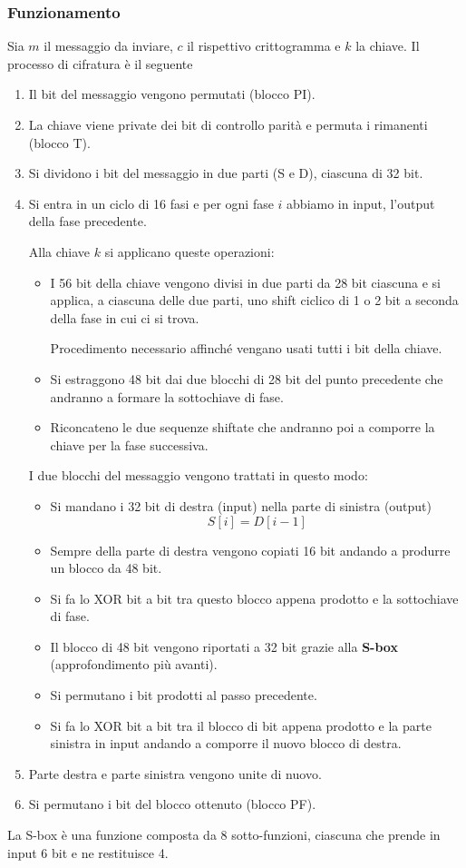 \subsubsection{Funzionamento}
Sia $m$ il messaggio da inviare, $c$ il rispettivo crittogramma e $k$ la chiave. Il processo di cifratura \`e il seguente
\begin{enumerate}
	\item Il bit del messaggio vengono permutati (blocco PI).
	\item La chiave viene private dei bit di controllo parit\`a e permuta i rimanenti (blocco T).
	\item Si dividono i bit del messaggio in due parti (S e D), ciascuna di 32 bit.
	\item Si entra in un ciclo di 16 fasi e per ogni fase $i$ abbiamo in input, l'output della fase precedente.

	      Alla chiave $k$ si applicano queste operazioni:
	      \begin{itemize}
		      \item I 56 bit della chiave vengono divisi in due parti da 28 bit ciascuna e si applica, a ciascuna delle
		            due parti, uno shift ciclico di 1 o 2 bit a seconda della fase in cui ci si trova.

		            Procedimento necessario affinch\'e vengano usati tutti i bit della chiave.
		      \item Si estraggono 48 bit dai due blocchi di 28 bit del punto precedente che andranno a formare la
		            sottochiave di fase.
		      \item Riconcateno le due sequenze shiftate che andranno poi a comporre la chiave per la fase successiva.
	      \end{itemize}
	      I due blocchi del messaggio vengono trattati in questo modo:
	      \begin{itemize}
		      \item Si mandano i 32 bit di destra (input) nella parte di sinistra (output)
		            \[ S[i] = D[i-1] \]
		      \item Sempre della parte di destra vengono copiati 16 bit andando a produrre un blocco da 48 bit.
		      \item Si fa lo XOR bit a bit tra questo blocco appena prodotto e la sottochiave di fase.
		      \item Il blocco di 48 bit vengono riportati a 32 bit grazie alla \textbf{S-box} (approfondimento pi\`u
		            avanti).
		      \item Si permutano i bit prodotti al passo precedente.
		      \item Si fa lo XOR bit a bit tra il blocco di bit appena prodotto e la parte sinistra in input andando a
		            comporre il nuovo blocco di destra.
	      \end{itemize}
	\item Parte destra e parte sinistra vengono unite di nuovo.
	\item Si permutano i bit del blocco ottenuto (blocco PF).
\end{enumerate}
La S-box \`e una funzione composta da 8 sotto-funzioni, ciascuna che prende in input 6 bit e ne restituisce 4.

